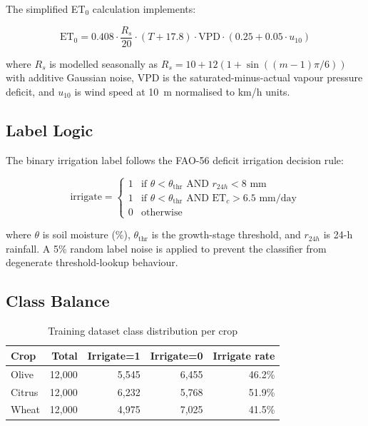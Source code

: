\documentclass[12pt,a4paper]{report}
\begin{document}
The simplified ET$_0$ calculation implements:

\begin{equation}
  \text{ET}_0 = 0.408 \cdot \frac{R_s}{20} \cdot (T + 17.8) \cdot \text{VPD} \cdot (0.25 + 0.05 \cdot u_{10})
  \label{eq:eto_simple}
\end{equation}

where $R_s$ is modelled seasonally as $R_s = 10 + 12(1 + \sin((m-1)\pi/6))$ with additive Gaussian noise, VPD is the saturated-minus-actual vapour pressure deficit, and $u_{10}$ is wind speed at 10~m normalised to km/h units.

\subsection{Label Logic}

The binary irrigation label follows the FAO-56 deficit irrigation decision rule:

\begin{equation}
  \text{irrigate} = \begin{cases}
    1 & \text{if } \theta < \theta_{\text{thr}} \text{ AND } r_{24h} < 8\text{ mm} \\
    1 & \text{if } \theta < \theta_{\text{thr}} \text{ AND } \text{ET}_c > 6.5\text{ mm/day} \\
    0 & \text{otherwise}
  \end{cases}
  \label{eq:label}
\end{equation}

where $\theta$ is soil moisture (\%), $\theta_{\text{thr}}$ is the growth-stage threshold, and $r_{24h}$ is 24-h rainfall. A 5\% random label noise is applied to prevent the classifier from degenerate threshold-lookup behaviour.

\subsection{Class Balance}

\begin{table}[H]
\centering
\caption{Training dataset class distribution per crop}
\label{tab:classbal}
\begin{tabular}{lrrrr}
\toprule
\textbf{Crop} & \textbf{Total} & \textbf{Irrigate=1} & \textbf{Irrigate=0} & \textbf{Irrigate rate} \\
\midrule
Olive  & 12,000 & 5,545 & 6,455 & 46.2\% \\
Citrus & 12,000 & 6,232 & 5,768 & 51.9\% \\
Wheat  & 12,000 & 4,975 & 7,025 & 41.5\% \\
\bottomrule
\end{tabular}
\end{table}
\end{document}
